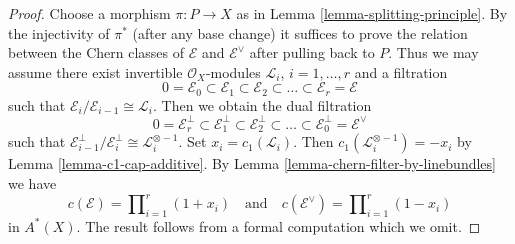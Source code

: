\documentclass[10pt,a4paper]{amsart}
\theoremstyle{plain}
\theoremstyle{definition}
\theoremstyle{remark}
\numberwithin{equation}{subsection}
\begin{document}
\begin{proof}
Choose a morphism $\pi : P \to X$ as in
Lemma \ref{lemma-splitting-principle}.
By the injectivity of $\pi^*$ (after any base change)
it suffices to prove the relation between
the Chern classes of $\mathcal{E}$ and $\mathcal{E}^\vee$
after pulling back to $P$. Thus we may assume there
exist invertible $\mathcal{O}_X$-modules
${\mathcal L}_i$, $i = 1, \ldots, r$
and a filtration
$$
0 = \mathcal{E}_0 \subset \mathcal{E}_1 \subset \mathcal{E}_2
\subset \ldots \subset \mathcal{E}_r = \mathcal{E}
$$
such that $\mathcal{E}_i/\mathcal{E}_{i - 1} \cong \mathcal{L}_i$.
Then we obtain the dual filtration
$$
0 = \mathcal{E}_r^\perp \subset \mathcal{E}_1^\perp \subset \mathcal{E}_2^\perp
\subset \ldots \subset \mathcal{E}_0^\perp = \mathcal{E}^\vee
$$
such that $\mathcal{E}_{i - 1}^\perp/\mathcal{E}_i^\perp \cong
\mathcal{L}_i^{\otimes -1}$.
Set $x_i = c_1(\mathcal{L}_i)$.
Then $c_1(\mathcal{L}_i^{\otimes -1}) = - x_i$
by Lemma \ref{lemma-c1-cap-additive}.
By Lemma \ref{lemma-chern-filter-by-linebundles}
we have
$$
c(\mathcal{E}) = \prod\nolimits_{i = 1}^r (1 + x_i)
\quad\text{and}\quad
c(\mathcal{E}^\vee) = \prod\nolimits_{i = 1}^r (1 - x_i)
$$
in $A^*(X)$. The result follows from a formal computation
which we omit.
\end{proof}
\end{document}

